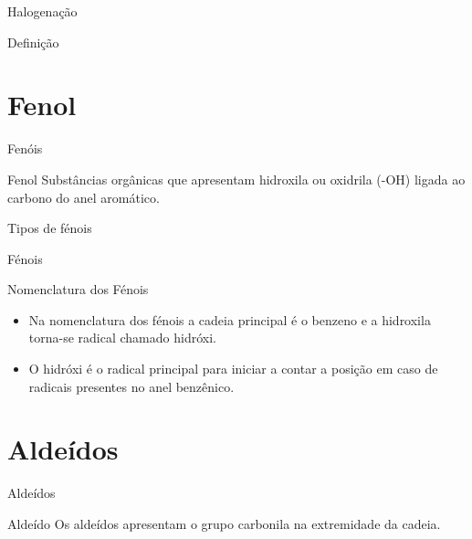 \documentclass[presentation,professionalfonts,aspectratio=169]{beamer}
\newcommand{\af}{\hspace{2cm}}
\begin{document}
\begin{frame}[label={sec:orgc1e6b56}]{Halogenação}
\begin{frame}[label={sec:orgc944da7}]{Definição}
\section{Fenol}
\label{sec:orgcde1ebc}
\begin{frame}[label={sec:org1103fa0}]{Fenóis}
\begin{mybox}{Fenol}
Substâncias  orgânicas  que  apresentam  hidroxila  ou oxidrila (-OH) ligada ao carbono do anel aromático.



\end{mybox}
\end{frame}

\begin{frame}[label={sec:orgd19c453}]{Tipos de fénois}
\begin{myex}{Fénois}
\centering
{} \af 
{} \af 
{}
\end{myex}
\end{frame}

\begin{frame}[label={sec:org4984863}]{Nomenclatura dos Fénois}
\begin{itemize}
\item Na nomenclatura dos fénois a cadeia principal é o benzeno e a hidroxila torna-se radical chamado \alert{hidróxi}.
\item O \alert{hidróxi} é o radical principal para iniciar a contar a posição em caso de radicais presentes no anel benzênico.
\end{itemize}
 \af
{} \af
{} \af
{} 
\end{frame}


\section{Aldeídos}
\label{sec:org035de22}
\begin{frame}[label={sec:orgb40a1d4}]{Aldeídos}
\begin{mybox}{Aldeído}
Os aldeídos apresentam o grupo carbonila na extremidade da cadeia.   



\end{mybox}
\end{frame}
\end{frame}
\end{frame}
\end{document}
